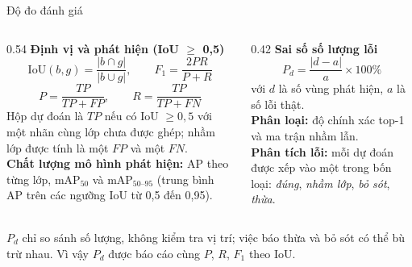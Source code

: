 \documentclass[aspectratio=169,11pt,t]{beamer}
\begin{document}

\begin{frame}{Độ đo đánh giá}
  \begin{columns}[T]
    \begin{column}{0.54\textwidth}
      \footnotesize
      \textbf{Định vị và phát hiện (IoU $\ge$ 0,5)}
      \[ \mathrm{IoU}(b,g)=\frac{|b\cap g|}{|b\cup g|},\qquad F_1=\frac{2PR}{P+R} \]
      \[ P=\frac{TP}{TP+FP},\qquad R=\frac{TP}{TP+FN} \]
      Hộp dự đoán là $TP$ nếu có IoU $\ge 0{,}5$ với một nhãn cùng lớp chưa được ghép; nhầm lớp được tính là một $FP$ và một $FN$.\\[4pt]
      \textbf{Chất lượng mô hình phát hiện:} AP theo từng lớp, $\mathrm{mAP}_{50}$ và $\mathrm{mAP}_{50\text{--}95}$ (trung bình AP trên các ngưỡng IoU từ 0,5 đến 0,95).
    \end{column}
    \begin{column}{0.42\textwidth}
      \footnotesize
      \textbf{Sai số số lượng lỗi \cite{r1}}
      \[ P_d=\frac{|d-a|}{a}\times 100\% \]
      với $d$ là số vùng phát hiện, $a$ là số lỗi thật.\\[4pt]
      \textbf{Phân loại:} độ chính xác top-1 và ma trận nhầm lẫn.\\[4pt]
      \textbf{Phân tích lỗi:} mỗi dự đoán được xếp vào một trong bốn loại: \textit{đúng}, \textit{nhầm lớp}, \textit{bỏ sót}, \textit{thừa}.
    \end{column}
  \end{columns}
  \vspace{4pt}
  \begin{why}
    \footnotesize $P_d$ chỉ so sánh số lượng, không kiểm tra vị trí; việc báo thừa và bỏ sót có thể bù trừ nhau. Vì vậy $P_d$ được báo cáo cùng $P$, $R$, $F_1$ theo IoU.
  \end{why}
\end{frame}

\end{document}

